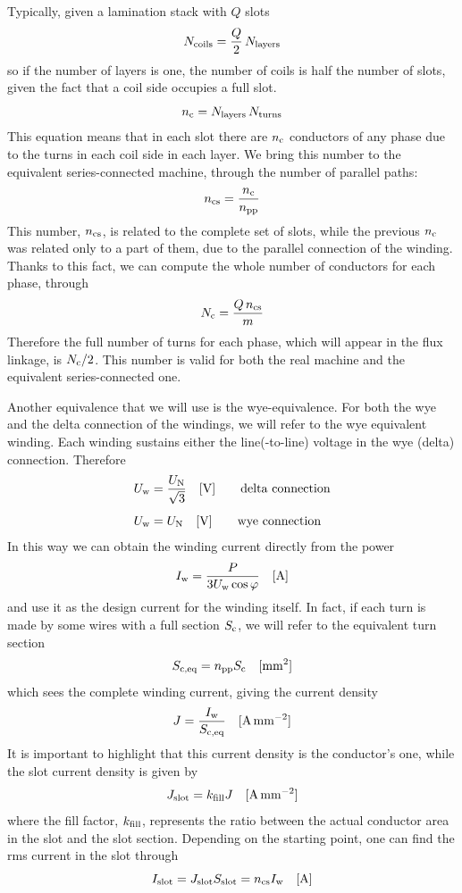 \documentclass[a4paper,11pt,oneside,fleqn,titlepage]{report}
\newcommand{\Ncoils}{N_{\textup{coils}}}
\newcommand{\Nturns}{N_{\textup{turns}}}
\newcommand{\Nlayers}{N_{\textup{layers}}}
\newcommand{\npp}{n_{\textup{pp}}}
\newcommand{\nc}{n_{\textup{c}}}
\newcommand{\ncs}{n_{\textup{cs}}}
\newcommand{\Nc}{N_{\textup{c}}}
\newcommand{\Sc}{S_{\textup{c}}}
\newcommand{\Sceq}{S_{\textup{c,eq}}}
\newcommand{\Uw}{U_{\textup{w}}}
\newcommand{\Iw}{I_{\textup{w}}}
\newcommand{\kfill}{k_{\textup{fill}}}
\newcommand{\Jslot}{J_{\textup{slot}}}
\newcommand{\Islot}{I_{\textup{slot}}}
\newcommand{\Sslot}{S_{\textup{slot}}}
\begin{document}
Typically, given a lamination stack with $ Q $ slots
\begin{equation*}
\Ncoils = \frac{Q}{2}\,\Nlayers
\end{equation*}
so if the number of layers is one, the number of coils is 
half the number of slots, given the fact that a coil side 
occupies a full slot.
\begin{equation*}
\nc = \Nlayers\,\Nturns
\end{equation*}
This equation means that in each slot there are $ \nc $ conductors of 
any phase due to the turns in each coil side in each layer.
We bring this number to the equivalent series-connected machine, through the 
number of parallel paths:
\begin{equation*}
\ncs = \frac{\nc}{\npp}
\end{equation*}
This number, $ \ncs $, is related to the complete set of slots, while the 
previous $ \nc $ was related only to a part of them, due to the parallel 
connection of the winding. Thanks to this fact, we can compute the whole number 
of conductors for each phase, through
\begin{equation*}
\Nc = \frac{Q\,\ncs}{m}
\end{equation*}
Therefore the full number of turns for each phase, which will appear in the 
flux linkage, is $ \Nc/2 $. This number is valid for both the real machine and 
the equivalent series-connected one.

Another equivalence that we will use is the wye-equivalence. For both the wye 
and the delta connection of the windings, we will refer to the wye equivalent 
winding. Each winding sustains either the line(-to-line) voltage in the wye 
(delta) connection. 
Therefore
\begin{align*}
\Uw &= \frac{U_{\textup{N}}}{\sqrt{3}} \quad[\si{\volt}]	\qquad \text{delta 
connection} \\[1ex]
\Uw &= U_{\textup{N}} \quad[\si{\volt}]	\qquad \text{wye connection}
\end{align*}
In this way we can obtain the winding current directly from the power
\[
\Iw = \frac{P}{3 \Uw\cos\varphi} \quad[\si{\ampere}]
\]
and use it as the design current for the winding itself. In fact, if each turn 
is made by some wires with a full section $ \Sc $, we will refer to the 
equivalent turn section
\[
\Sceq = \npp \Sc \quad [\si{\milli\meter\squared}]
\]
which sees the complete winding current, giving the current density
\[
J = \frac{\Iw}{\Sceq} \quad [\si{\ampere\per\milli\meter\squared}]
\]
It is important to highlight that this current density is the conductor's one, 
while the slot current density is given by
\[
\Jslot = \kfill J \quad [\si{\ampere\per\milli\meter\squared}]
\]
where the fill factor, $ \kfill $, represents the ratio between the actual 
conductor area in the slot and the slot section.
Depending on the starting point, one can find the rms current in the slot 
through
\[
\Islot = \Jslot \Sslot = \ncs \Iw \quad[\si{\ampere}]
\]
\end{document}
